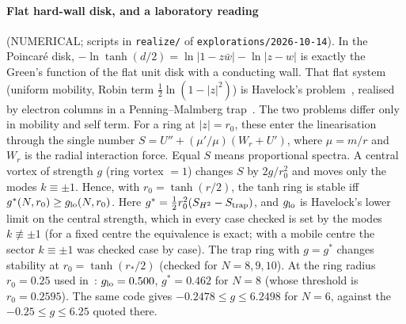 \documentclass[11pt]{article}
\theoremstyle{remark}
\begin{document}
\paragraph{Flat hard-wall disk, and a laboratory reading} (NUMERICAL; scripts in \texttt{realize/} of
\texttt{explorations/2026-10-14}). In the Poincar\'e disk, $-\ln\tanh(d/2)=\ln|1-z\bar w|-\ln|z-w|$ is exactly the Green's function of the flat unit disk with a
conducting wall. That flat system (uniform mobility, Robin term $\frac12\ln(1-|z|^2)$) is Havelock's problem~\cite{Havelock},
realised by electron columns in a Penning--Malmberg trap~\cite{DF}. The two problems differ only in mobility and self
term. For a ring at $|z|=r_0$, these enter the linearisation through the single number
$S=U''+(\mu'/\mu)(W_r+U')$, where $\mu=m/r$ and $W_r$ is the radial interaction force. Equal $S$ means proportional
spectra. A central vortex of strength $g$ (ring vortex $=1$) changes $S$ by $2g/r_0^2$ and moves only the modes
$k\equiv\pm1$. Hence, with $r_0=\tanh(r/2)$, the tanh ring is stable iff $g^*(N,r_0)\ge g_{\rm lo}(N,r_0)$. Here
$g^*=\tfrac12 r_0^2(S_{H^2}-S_{\rm trap})$, and $g_{\rm lo}$ is Havelock's lower limit on the central strength, which in
every case checked is set by the modes $k\not\equiv\pm1$ (for a fixed centre the equivalence is exact; with a mobile
centre the sector $k\equiv\pm1$ was checked case by case). The trap ring with $g=g^*$ changes stability at $r_0=\tanh(r_*/2)$ (checked for
$N=8,9,10$). At the ring radius $r_0=0.25$ used in~\cite{DF}: $g_{\rm lo}=0.500$, $g^*=0.462$ for $N=8$ (whose
threshold is $r_0=0.2595$). The same code gives $-0.2478\le g\le6.2498$ for $N=6$, against the $-0.25\le g\le6.25$
quoted there.
\end{document}

